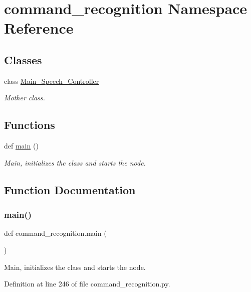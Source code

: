 \hypertarget{namespacecommand__recognition}{}\section{command\+\_\+recognition Namespace Reference}
\label{namespacecommand__recognition}
\subsection*{Classes}
\begin{DoxyCompactItemize}
\item 
class \hyperlink{classcommand__recognition_1_1_main___speech___controller}{Main\+\_\+\+Speech\+\_\+\+Controller}
\begin{DoxyCompactList}\small\item\em Mother class. \end{DoxyCompactList}\end{DoxyCompactItemize}
\subsection*{Functions}
\begin{DoxyCompactItemize}
\item 
def \hyperlink{namespacecommand__recognition_a7ea48f781ea104f0a02f0b755f671b52}{main} ()
\begin{DoxyCompactList}\small\item\em Main, initializes the class and starts the node. \end{DoxyCompactList}\end{DoxyCompactItemize}


\subsection{Function Documentation}
\mbox{\label{namespacecommand__recognition_a7ea48f781ea104f0a02f0b755f671b52}} 
\subsubsection{\texorpdfstring{main()}{main()}}
{\footnotesize\ttfamily def command\+\_\+recognition.\+main (\begin{DoxyParamCaption}{ }\end{DoxyParamCaption})}



Main, initializes the class and starts the node. 



Definition at line 246 of file command\+\_\+recognition.\+py.

